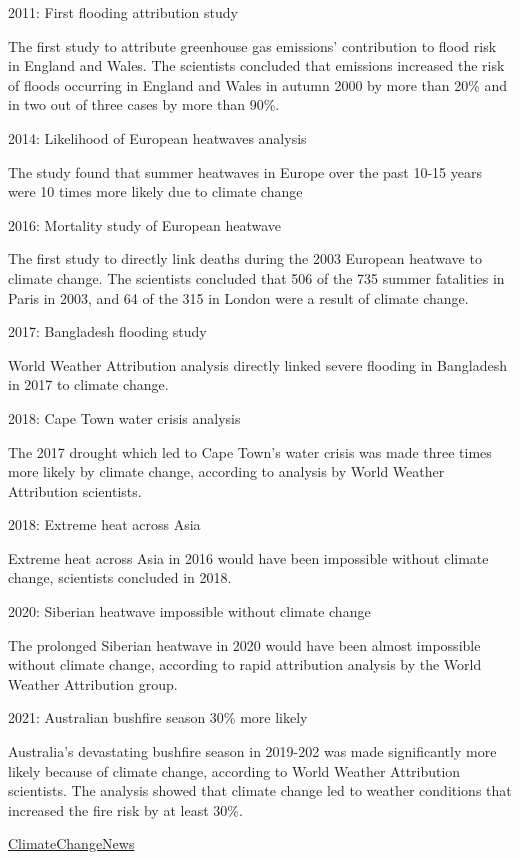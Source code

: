 \documentclass[
]{book}
\begin{document}
2011: First flooding attribution study

The first study to attribute greenhouse gas emissions' contribution to flood risk in England and Wales. The scientists concluded that emissions increased the risk of floods occurring in England and Wales in autumn 2000 by more than 20\% and in two out of three cases by more than 90\%.

2014: Likelihood of European heatwaves analysis

The study found that summer heatwaves in Europe over the past 10-15 years were 10 times more likely due to climate change

2016: Mortality study of European heatwave

The first study to directly link deaths during the 2003 European heatwave to climate change. The scientists concluded that 506 of the 735 summer fatalities in Paris in 2003, and 64 of the 315 in London were a result of climate change.

2017: Bangladesh flooding study

World Weather Attribution analysis directly linked severe flooding in Bangladesh in 2017 to climate change.

2018: Cape Town water crisis analysis

The 2017 drought which led to Cape Town's water crisis was made three times more likely by climate change, according to analysis by World Weather Attribution scientists.

2018: Extreme heat across Asia

Extreme heat across Asia in 2016 would have been impossible without climate change, scientists concluded in 2018.

2020: Siberian heatwave impossible without climate change

The prolonged Siberian heatwave in 2020 would have been almost impossible without climate change, according to rapid attribution analysis by the World Weather Attribution group.

2021: Australian bushfire season 30\% more likely

Australia's devastating bushfire season in 2019-202 was made significantly more likely because of climate change, according to World Weather Attribution scientists. The analysis showed that climate change led to weather conditions that increased the fire risk by at least 30\%.

\href{https://www.climatechangenews.com/2021/08/04/timeline-science-linking-climate-change-extreme-weather-took-off/}{ClimateChangeNews}
\end{document}
